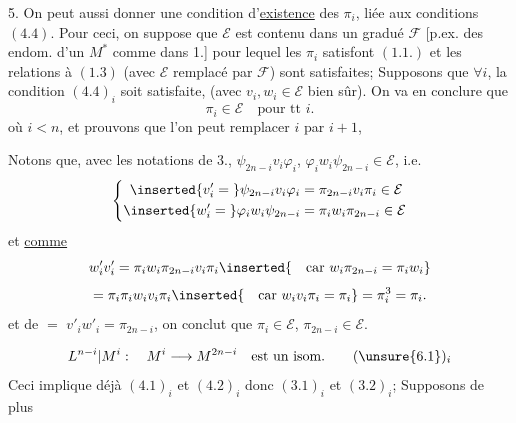 5. On peut aussi donner une condition d'\uline{existence} des $\pi_i$, liée aux conditions $(4.4)$. Pour ceci, on suppose que $\mathcal E$ est contenu dans un  gradué $\mathcal F$ [p.ex.  des endom. d'un $M^*$ comme dans 1.] pour lequel les $\pi_i$ satisfont $(1.1.)$ et les relations  à $(1.3)$ (avec $\mathcal E$ remplacé par $\mathcal F$) sont satisfaites;  Supposons que $\forall i$, la condition $(4.4)_i$ soit satisfaite, (avec $v_i,w_i\in\mathcal E$ bien sûr). On va en conclure que
\[
\pi_i\in\mathcal E\quad\text{pour tt }i.
\tag{5.1}
\]
 où $i<n$, et prouvons que l'on peut remplacer $i$ par $i+1$, 

Notons que, avec les notations de 3.,    $\psi_{2n-i}v_i\varphi_i$, $\varphi_iw_i\psi_{2n-i}\in\mathcal E$, i.e.
\[
\left\{\begin{aligned}
\inserted{v'_i={}}\psi_{2n-i}v_i\varphi_i&=\pi_{2n-i}v_i\pi_i\in\mathcal E\\
\inserted{w'_i={}}\varphi_iw_i\psi_{2n-i}&=\pi_iw_i\pi_{2n-i}\in\mathcal E
\end{aligned}\right.
\]
et \uline{comme} 
\[
w'_iv'_i=\pi_iw_i\pi_{2n-i}v_i\pi_i
\inserted{\quad\text{car }w_i\pi_{2n-i}=\pi_iw_i}\]
\[
=\pi_i\pi_iw_iv_i\pi_i
\inserted{\quad\text{car }w_iv_i\pi_i=\pi_i}
=\pi_i^3=\pi_i.
\]
et de $=$  $v'_iw'_i=\pi_{2n-i}$, on conclut que $\pi_i\in\mathcal E$, $\pi_{2n-i}\in\mathcal E$.

\[
L^{n-i}|M^i:\quad M^i\longrightarrow M^{2n-i}\quad\text{est un isom.}
\tag*{$(\unsure{6.1})_i$}
\]
Ceci implique déjà $(4.1)_i$ et $(4.2)_i$ donc $(3.1)_i$ et $(3.2)_i$;  Supposons de plus

